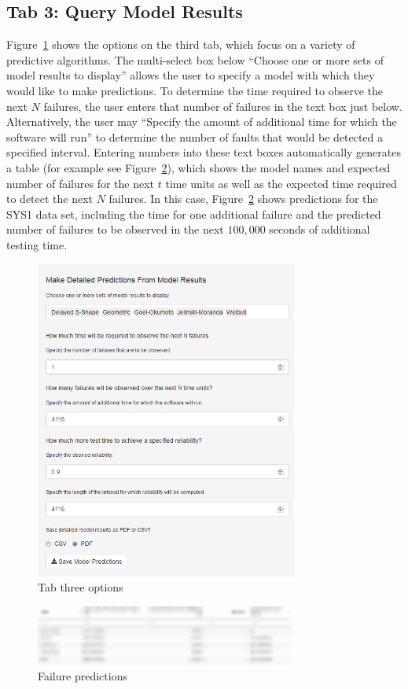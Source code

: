 \documentclass[conference]{IEEEtran}
\begin{document}
\subsection{Tab 3: Query Model Results}\label{tab3}
Figure~\ref{fig_Tab3} shows the options on the third tab, which focus on a variety of predictive algorithms. The multi-select box below ``Choose one or more sets of model results to display'' allows the user to specify a model with which they would like to make predictions. To determine the time required to observe the next $N$ failures, the user enters that number of failures in the text box just below.  Alternatively, the user may ``Specify the amount of additional time for which the software will run'' to determine the number of faults that would be detected a specified interval. Entering numbers into these text boxes automatically generates a table (for example see Figure~\ref{fig_Tab3-table}), which shows the model names and expected number of failures for the next $t$ time units as well as the expected time required to detect the next $N$ failures. In this case, Figure~\ref{fig_Tab3-table} shows predictions for the SYS1 data set, including the time for one additional failure and the predicted number of failures to be observed in the next $100,000$ seconds of additional testing time.

\begin{figure}[!h]
\centering
\includegraphics[width=3.4in]{Figures/Fig13}
\caption{Tab three options}
\label{fig_Tab3}
\end{figure}


\begin{figure}[!h]
\centering
\includegraphics[width=3.4in]{Figures/Tab3-table}
\caption{Failure predictions}
\label{fig_Tab3-table}
\end{figure}
\end{document}
